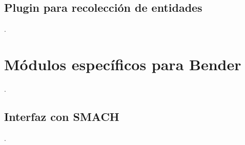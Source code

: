 \subsection{Plugin para recolección de entidades}

.



\section{Módulos específicos para Bender}

.


\subsection{Interfaz con SMACH}

.



